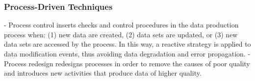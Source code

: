\documentclass[pdftex,english,oribibl]{llncs}
\begin{document}
\begin{comment}
 Heterogeneities can be classified into technological heterogeneities, schema heterogeneities,and instance-level heterogeneities.
In distributed, cooperative, and P2P information systems data sources are characterized by various kinds of heterogeneities that can be generally classified into

(1) technological heterogeneities, (2) schema heterogeneities, and (3) instance-level heterogeneities.
Technological heterogeneities are due to the use of products by different vendors, employed at various layers of an information and communication infrastructure.
Schema heterogeneities are primarily caused by the use of (1) different data models, as in the case of a source that adopts the relational data model and a different source that adopts the XML data model, and (2) different representations for the same object, such as two relational sources that represent an object as a table and an attribute. Instance-level heterogeneities are caused by different, conflicting data values provided by distinct sources for the same objects. For instance, this type of heterogeneity can be caused by independent and poorly coordinated processes that feed the different data sources.
Data integration must face all the types of these listed heterogeneities.
\end{comment}

\subsubsection{Process-Driven Techniques}
- Process control inserts checks and control procedures in the data production process when: (1) new data are created, (2) data sets are updated, or (3) new data sets are accessed by the process. In this way, a reactive strategy is applied to data modification events, thus avoiding data degradation and error propagation.
- Process redesign redesigns processes in order to remove the causes of poor quality and introduces new activities that produce data of higher quality.
\begin{comment}
\subsubsection{Techniques}
 - Column analysis: Number of (unique) values and the number of instances per value as percentage from the total number of instances in that column
 - Cross-domain analysis
 - Data validation
 - Domain analysis
 - Lexical analysis
 - Matching algorithms: identify duplicates
 - Primary key and foreign key analysis (PK/FK analysis) : are good candidates for a PK/FK
 - Schema matching: two attributes are semantically equivalent
 - Semantic profiling
\end{comment}
\end{document}
